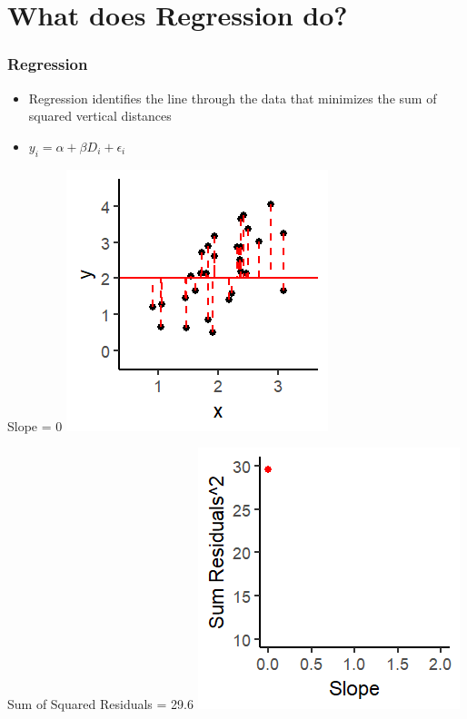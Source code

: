 \documentclass[xcolor=x11names,compress]{beamer}\usepackage[]{graphicx}\usepackage[]{color}
\makeatletter
\def\maxwidth{ %
  \ifdim\Gin@nat@width>\linewidth
    \linewidth
  \else
    \Gin@nat@width
  \fi
}
\newenvironment{knitrout}{}{} %
\renewcommand{\(}{\begin{columns}}
\renewcommand{\)}{\end{columns}}
\newcommand{\<}[1]{\begin{column}{#1}}
\renewcommand{\>}{\end{column}}
\makeatother
\begin{document}

\section{What does Regression do?}




\begin{frame}
\frametitle{Regression}
\begin{itemize}
\item Regression identifies the line through the data that minimizes the sum of squared vertical distances 
\pause
\item $y_i = \alpha + \beta D_i + \epsilon_i$
\pause
\end{itemize}
\begin{multicols}{2}
Slope = 0
\begin{knitrout}
\color{fgcolor}
\includegraphics[width=\maxwidth]{figure/graph_ols1-1} 

\end{knitrout}
\columnbreak
Sum of Squared Residuals = 29.6
\begin{knitrout}
\color{fgcolor}
\includegraphics[width=\maxwidth]{figure/graph_ssr1-1} 

\end{knitrout}
\end{multicols}
\end{frame}
\end{document}

